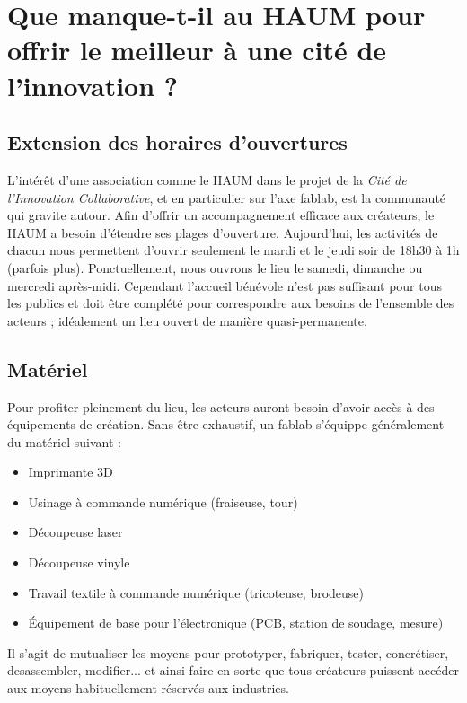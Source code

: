 \documentclass[a4paper,10pt]{scrartcl}
\begin{document}
\section{Que manque-t-il au HAUM pour offrir le meilleur à une cité de l'innovation ?}

\subsection*{Extension des horaires d'ouvertures}

L'intérêt d'une association comme le HAUM dans le projet de la \emph{Cité de l'Innovation Collaborative}, et en particulier sur l'axe fablab, est la communauté qui gravite autour.
Afin d'offrir un accompagnement efficace aux créateurs, le HAUM a besoin d'étendre ses plages d'ouverture. Aujourd'hui, les activités de chacun nous permettent d'ouvrir seulement le mardi et le jeudi soir de 18h30 à 1h (parfois plus). Ponctuellement, nous ouvrons le lieu le samedi, dimanche ou mercredi après-midi.
Cependant l'accueil bénévole n'est pas suffisant pour tous les publics et doit être complété pour correspondre aux besoins de l'ensemble des acteurs ; idéalement un lieu ouvert de manière quasi-permanente.

\subsection*{Matériel}

Pour profiter pleinement du lieu, les acteurs auront besoin d'avoir accès à des équipements de création.
Sans être exhaustif, un fablab s'équippe généralement du matériel suivant :

\begin{itemize}
 \item Imprimante 3D
 \item Usinage à commande numérique (fraiseuse, tour)
 \item Découpeuse laser
 \item Découpeuse vinyle
 \item Travail textile à commande numérique (tricoteuse, brodeuse)
 \item Équipement de base pour l'électronique (PCB, station de soudage, mesure)
\end{itemize}

Il s'agit de mutualiser les moyens pour prototyper, fabriquer, tester, concrétiser, desassembler, modifier... et ainsi faire en sorte que tous créateurs puissent accéder aux moyens habituellement réservés aux industries.
\end{document}
